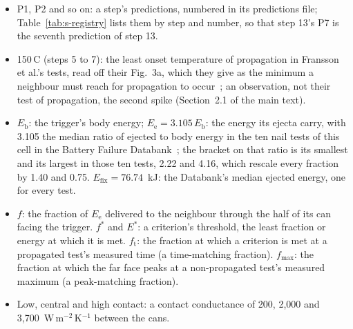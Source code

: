 \documentclass[preprint,12pt]{elsarticle}
\newcommand{\degC}{\,\textdegree C}
\begin{document}
\begin{itemize}
\item P1, P2 and so on: a step's predictions, numbered in its predictions file; Table~\ref{tab:s-registry} lists them by step and number, so that step 13's P7 is the seventh prediction of step 13.
\item 150\degC{} (steps 5 to 7): the least onset temperature of propagation in Fransson et al.'s tests, read off their Fig.~3a, which they give as the minimum a neighbour must reach for propagation to occur~\cite{fransson2024exploring}; an observation, not their test of propagation, the second spike (Section~2.1 of the main text).
\item $E_\mathrm{b}$: the trigger's body energy; $E_\mathrm{e}=3.105\,E_\mathrm{b}$: the energy its ejecta carry, with 3.105 the median ratio of ejected to body energy in the ten nail tests of this cell in the Battery Failure Databank~\cite{finegan2024databank}; the bracket on that ratio is its smallest and its largest in those ten tests, 2.22 and 4.16, which rescale every fraction by 1.40 and 0.75. $E_\mathrm{fix}=76.74$~kJ: the Databank's median ejected energy, one for every test.
\item $f$: the fraction of $E_\mathrm{e}$ delivered to the neighbour through the half of its can facing the trigger. $f^*$ and $E^*$: a criterion's threshold, the least fraction or energy at which it is met. $f_\mathrm{t}$: the fraction at which a criterion is met at a propagated test's measured time (a time-matching fraction). $f_\mathrm{max}$: the fraction at which the far face peaks at a non-propagated test's measured maximum (a peak-matching fraction).
\item Low, central and high contact: a contact conductance of 200, 2,000 and 3,700~W\,m$^{-2}$\,K$^{-1}$ between the cans.

\end{itemize}
\end{document}
